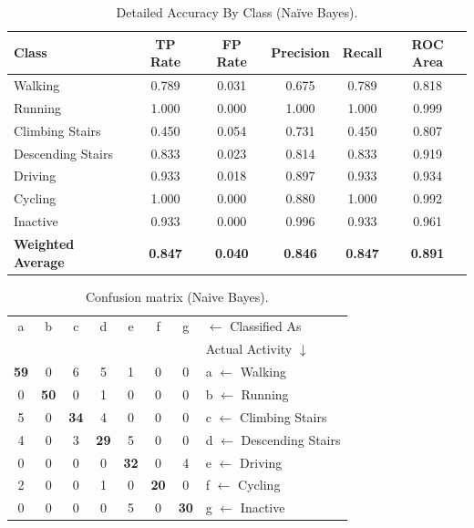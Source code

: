 \documentclass[12pt,a4paper,oneside]{book}
\begin{document}
\begin{table}[!tbh]
\caption{Detailed Accuracy By Class (Na\"ive Bayes).}
\label{tab:Perf_Metrics_Naive_Bayes}
\centering
\begin{tabular}[width=\columnwidth]{|p{1.3in}|c|c|c|c|c|}
\hline
Class               & TP Rate   & FP Rate   & Precision & Recall    & ROC Area \\
\hline
Walking 	        	& 0.789	    & 0.031	    & 0.675	    & 0.789	    & 0.818 \\
Running	            & 1.000	    & 0.000	    & 1.000	    & 1.000	    & 0.999 \\
Climbing Stairs	    & 0.450	    & 0.054	    & 0.731	    & 0.450	    & 0.807 \\
Descending Stairs		& 0.833	    & 0.023	    & 0.814	    & 0.833	    & 0.919 \\
Driving	            & 0.933	    & 0.018	    & 0.897	    & 0.933	    & 0.934 \\
Cycling	            & 1.000	    & 0.000	    & 0.880	    & 1.000	    & 0.992 \\
Inactive            & 0.933	    & 0.000	    & 0.996	    & 0.933	    & 0.961 \\
\hline
\textbf{Weighted Average}	& \textbf{0.847}	    & \textbf{0.040}	    & \textbf{0.846}	    & \textbf{0.847}	    & \textbf{0.891} \\
\hline
\end{tabular}
\end{table}

\begin{table}[!tbh]
\caption{Confusion matrix (Naive Bayes).}
\label{tab:Confusion_Matrix_Naive Bayes}
\centering
\begin{tabular}[width=\columnwidth]{|ccccccc|p{1.5in}|}
\hline
a & b & c & d & e & f & g & $\leftarrow$ Classified As \\
  &   &   &   &   &   &   & Actual Activity $\downarrow$ \\
\hline
\textbf{59} & 0 & 6 & 5 & 1 & 0 & 0 & a $\leftarrow$ Walking \\
0 & \textbf{50} & 0 & 1 & 0 & 0 & 0 & b $\leftarrow$ Running \\
5 & 0 & \textbf{34} & 4 & 0 & 0 & 0 & c $\leftarrow$ Climbing Stairs \\
4 & 0 & 3 & \textbf{29} & 5 & 0 & 0 & d $\leftarrow$ Descending Stairs \\
0 & 0 & 0 & 0 & \textbf{32} & 0 & 4 & e $\leftarrow$ Driving \\
2 & 0 & 0 & 1 & 0 & \textbf{20} & 0 & f $\leftarrow$ Cycling \\
0 & 0 & 0 & 0 & 5 & 0 & \textbf{30} & g $\leftarrow$ Inactive \\
\hline
\end{tabular}
\end{table}
\end{document}
